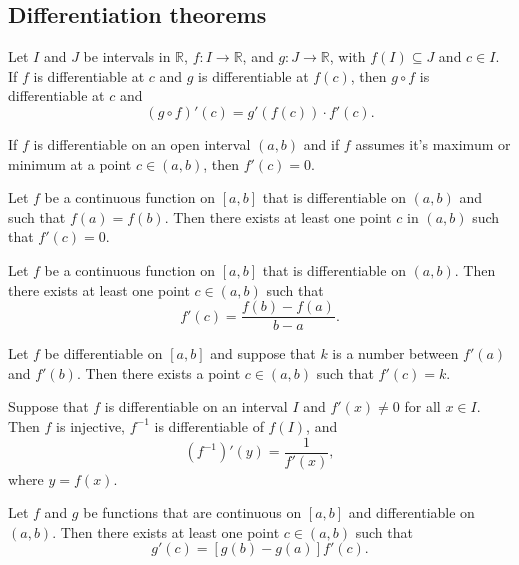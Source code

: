 \documentclass{article}
\begin{document}
\subsection{Differentiation theorems}
\begin{theorem}
	Let \(I\) and \(J\) be intervals in \(\mathbb{R}\), \(f:I\rightarrow\mathbb{R}\), and \(g:J\rightarrow\mathbb{R}\), with \(f(I)\subseteq J\) and \(c\in I\). If \(f\) is differentiable at \(c\) and \(g\) is differentiable at \(f(c)\), then \(g\circ f\) is differentiable at \(c\) and
	\begin{equation*}
		(g\circ f)'(c)=g'(f(c))\cdot f'(c).
	\end{equation*}
\end{theorem}
\begin{theorem}
	If \(f\) is differentiable on an open interval \((a,b)\) and if \(f\) assumes it's maximum or minimum at a point \(c\in (a,b)\), then \(f'(c)=0\).
\end{theorem}
\begin{theorem}
	Let \(f\) be a continuous function on \([a,b]\) that is differentiable on \((a,b)\) and such that \(f(a)=f(b)\). Then there exists at least one point \(c\) in \((a,b)\) such that \(f'(c)=0\).
\end{theorem}
\begin{theorem}
	Let \(f\) be a continuous function on \([a,b]\) that is differentiable on \((a,b)\). Then there exists at least one point \(c\in(a,b)\) such that
	\begin{equation*}
		f'(c)=\frac{f(b)-f(a)}{b-a}.
	\end{equation*}
\end{theorem}
\begin{theorem}
	Let \(f\) be differentiable on \([a,b]\) and suppose that \(k\) is a number between \(f'(a)\) and \(f'(b)\). Then there exists a point \(c\in(a,b)\) such that \(f'(c)=k\).
\end{theorem}
\begin{theorem}
	Suppose that \(f\) is differentiable on an interval \(I\) and \(f'(x)\neq 0\) for all \(x\in I\). Then \(f\) is injective, \(f^{-1}\) is differentiable of \(f(I)\), and
	\begin{equation*}
		(f^{-1})'(y)=\frac{1}{f'(x)},
	\end{equation*}
	where \(y=f(x)\).
\end{theorem}
\begin{theorem}
	Let \(f\) and \(g\) be functions that are continuous on \([a,b]\) and differentiable on \((a,b)\). Then there exists at least one point \(c\in(a,b)\) such that
	\begin{equation*}
		[f(b)-f(a)]g'(c)=[g(b)-g(a)]f'(c).
	\end{equation*}
\end{theorem}
\end{document}
